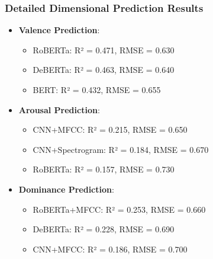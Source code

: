 \begin{frame}
\frametitle{Detailed Dimensional Prediction Results}
\begin{itemize}
    \item \textbf{Valence Prediction}:
    \begin{itemize}
        \item RoBERTa: R² = 0.471, RMSE = 0.630
        \item DeBERTa: R² = 0.463, RMSE = 0.640
        \item BERT: R² = 0.432, RMSE = 0.655
    \end{itemize}
    \item \textbf{Arousal Prediction}:
    \begin{itemize}
        \item CNN+MFCC: R² = 0.215, RMSE = 0.650
        \item CNN+Spectrogram: R² = 0.184, RMSE = 0.670
        \item RoBERTa: R² = 0.157, RMSE = 0.730
    \end{itemize}
    \item \textbf{Dominance Prediction}:
    \begin{itemize}
        \item RoBERTa+MFCC: R² = 0.253, RMSE = 0.660
        \item DeBERTa: R² = 0.228, RMSE = 0.690
        \item CNN+MFCC: R² = 0.186, RMSE = 0.700
    \end{itemize}
\end{itemize}
\end{frame}

